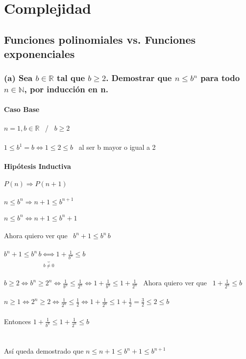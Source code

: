 \documentclass[10pt, a4paper]{article}
\begin{document}



\maketitle

\section{Complejidad}

\subsection{Funciones polinomiales vs. Funciones exponenciales}
\subsubsection*{(a) Sea $b \in \mathbb{R}$ tal que $b \ge 2$. Demostrar que $n \le b^n$ para todo $n \in \mathbb{N}$, por inducción en n.}
\paragraph*{Caso Base}
$n = 1, b \in \mathbb{R}$ \ / \ $b \ge 2$ \\ \\
$1 \le b^1 = b \Leftrightarrow 1 \le 2 \le b$ \ al ser b mayor o igual a 2

\paragraph*{Hipótesis Inductiva}
$P(n) \Rightarrow P(n+1)$ \\ \\
$n \le b^n \Rightarrow n+1 \le b^{n+1}$ \\ \\
$n \le b^n \Leftrightarrow n+1 \le b^n+1$ \\ \\
 Ahora quiero ver que \ $b^n+1 \le b^n\,b$ \\ \\
$b^n+1 \le b^n\,b \underbrace{\Leftrightarrow}_{b \ne 0} 1+\frac{1}{b^n}\le b$ \\ \\
$b \ge 2 \Leftrightarrow b^n \ge 2^n \Leftrightarrow \frac{1}{b^n} \le \frac{1}{2^n} \Leftrightarrow \boxed{1+\frac{1}{b^n} \le 1+\frac{1}{2^n}}$ \ Ahora quiero ver que \ $1+\frac{1}{2^n} \le b$ \\ \\
$n \ge 1 \Leftrightarrow 2^n \ge 2 \Leftrightarrow \frac{1}{2^n} \le \frac{1}{2} \Leftrightarrow 1+\frac{1}{2^n} \le 1+\frac{1}{2} = \frac{3}{2} \le 2 \le b$ \\ \\
Entonces $\boxed{1+\frac{1}{b^n} \le 1+\frac{1}{2^n} \le b}$ \\\\ \\
Así queda demostrado que $n \le n+1 \le b^n+1 \le b^{n+1}$
\end{document}
